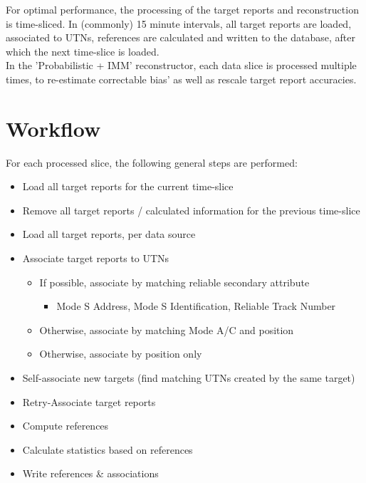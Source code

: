 For optimal performance, the processing of the target reports and reconstruction is time-sliced. In (commonly) 15 minute intervals, all target reports are loaded, associated to UTNs, references are calculated and written to the database, after which the next time-slice is loaded. \\

In the 'Probabilistic + IMM' reconstructor, each data slice is processed multiple times, to re-estimate correctable bias' as well as rescale target report accuracies. \\



\section{Workflow}
For each processed slice, the following general steps are performed:

\begin{itemize}
\item Load all target reports for the current time-slice
\item Remove all target reports / calculated information for the previous time-slice
\item Load all target reports, per data source
\item Associate target reports to UTNs
   \begin{itemize}  
   \item If possible, associate by matching reliable secondary attribute
    \begin{itemize}  
    \item Mode S Address, Mode S Identification, Reliable Track Number
    \end{itemize}
   \item Otherwise, associate by matching Mode A/C and position
   \item Otherwise, associate by position only
   \end{itemize}
\item Self-associate new targets (find matching UTNs created by the same target)
\item Retry-Associate target reports
\item Compute references
\item Calculate statistics based on references
\item Write references \& associations
\end{itemize}
\ \\

